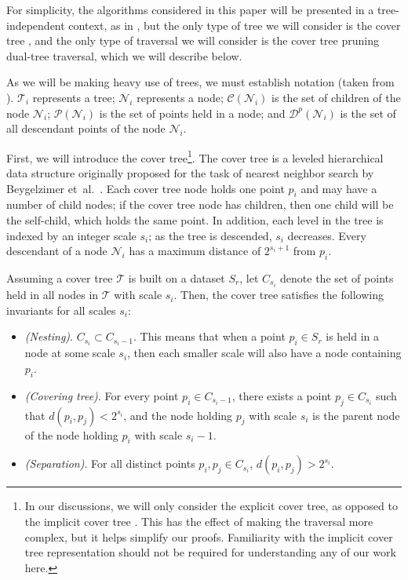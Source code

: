 For simplicity, the algorithms considered in this paper will be presented in a
tree-independent context, as in \cite{curtin2013tree}, but the only type of
tree we will consider is the cover tree \cite{langford2006}, and the only type
of traversal we will consider is the cover tree pruning dual-tree traversal, which
we will describe below.

As we will be making heavy use of trees, we must establish notation (taken from
\cite{curtin2013tree}).  $\mathscr{T}_i$ represents a tree; $\mathscr{N}_i$
represents a node; $\mathscr{C}(\mathscr{N}_i)$ is the set of children of the
node $\mathscr{N}_i$; $\mathscr{P}(\mathscr{N}_i)$ is the set of points held in
a node; and $\mathscr{D}^p(\mathscr{N}_i)$ is the set of all descendant points
of the node $\mathscr{N}_i$.

First, we will introduce the cover tree\footnote{In our discussions, we will
only consider the explicit cover tree, as opposed to the implicit cover tree
\cite{langford2006}.  This has the effect of making the traversal more complex,
but it helps simplify our proofs.  Familiarity with the implicit cover tree
representation should not
be required for understanding any of our work here.}.  The cover tree is a
leveled hierarchical data structure originally proposed for the task of nearest
neighbor search by Beygelzimer et~al.~\cite{langford2006}.  Each cover tree node
holds one point $p_i$ and may have a number of child nodes; if the cover tree
node has children, then one child will be the self-child, which holds the same
point.  In addition, each level in the tree is indexed by an integer scale
$s_i$; as the tree is descended, $s_i$ decreases.  Every descendant of a node
$\mathscr{N}_i$ has a maximum distance of $2^{s_i + 1}$ from $p_i$.

Assuming a cover tree $\mathscr{T}$ is built on a dataset $S_r$, let $C_{s_i}$
denote the set of points held in all nodes in $\mathscr{T}$ with scale $s_i$.
Then, the cover tree satisfies the following invariants for all scales $s_i$:

\begin{itemize}

\item {\em (Nesting)}.  $C_{s_i} \subset C_{s_i - 1}$.  This means that when a
point $p_i \in S_r$ is held in a node at some scale $s_i$, then each smaller
scale will also have a node containing $p_i$.

\item {\em (Covering tree)}.  For every point $p_i \in C_{s_i - 1}$, there
exists a point $p_j \in C_{s_i}$ such that $d(p_i, p_j) < 2^{s_i}$, and the node
holding $p_j$ with scale $s_i$ is the parent node of the node holding $p_i$ with
scale $s_i - 1$.

\item {\em (Separation)}.  For all distinct points $p_i, p_j \in C_{s_i}$,
$d(p_i, p_j) > 2^{s_i}$.

\end{itemize}

